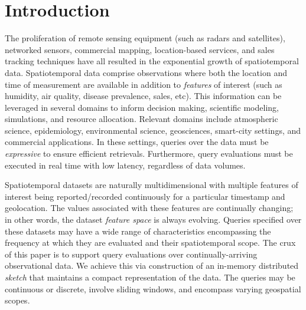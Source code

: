 \section{Introduction}
\label{sec:introduction}
The proliferation of remote sensing equipment (such as radars and satellites), networked sensors, commercial mapping, location-based services, and sales tracking techniques have all resulted in the exponential growth of spatiotemporal data. Spatiotemporal data comprise observations where both the location and time of measurement are available in addition to \emph{features} of interest (such as humidity, air quality, disease prevalence, sales, etc). This information can be leveraged in several domains to inform decision making, scientific modeling, simulations, and resource allocation. Relevant domains include atmospheric science, epidemiology, environmental science, geosciences, smart-city settings, and commercial applications. In these settings, queries over the data must be \emph{expressive} to ensure efficient retrievals. Furthermore, query evaluations must be executed in real time with low latency, regardless of data volumes.

Spatiotemporal datasets are naturally multidimensional with multiple features of interest being reported/recorded continuously for a particular timestamp and geolocation. The values associated with these features are continually changing; in other words, the dataset \emph{feature space} is always evolving.  Queries specified over these datasets may have a wide range of characteristics encompassing the frequency at which they are evaluated and their spatiotemporal scope. The crux of this paper is to support query evaluations over continually-arriving observational data. We achieve this via construction of an in-memory distributed \emph{sketch} that maintains a compact representation of the data. The queries may be continuous or discrete, involve sliding windows, and encompass varying geospatial scopes.

